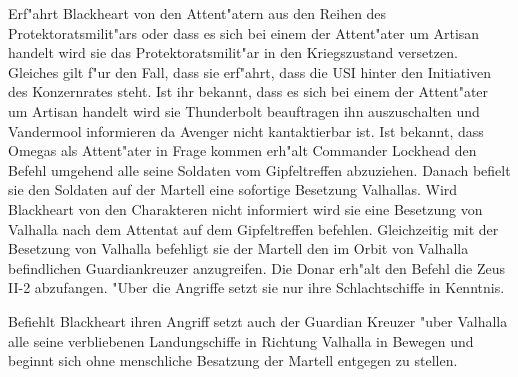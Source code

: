 
























 

Erf"ahrt Blackheart von den Attent"atern aus den Reihen des Protektoratsmilit"ars oder dass es sich bei einem der Attent"ater um Artisan handelt wird sie das Protektoratsmilit"ar in den Kriegszustand versetzen. Gleiches gilt f"ur den Fall, dass sie erf"ahrt, dass die USI hinter den Initiativen des Konzernrates steht. Ist ihr bekannt, dass es sich bei einem der Attent"ater um Artisan handelt wird sie Thunderbolt beauftragen ihn auszuschalten und Vandermool informieren da Avenger nicht kantaktierbar ist. Ist bekannt, dass Omegas als Attent"ater in Frage kommen erh"alt Commander Lockhead den Befehl umgehend alle seine Soldaten vom Gipfeltreffen abzuziehen. Danach befielt sie den Soldaten auf der Martell eine sofortige Besetzung Valhallas. Wird Blackheart von den Charakteren nicht informiert wird sie eine Besetzung von Valhalla nach dem Attentat auf dem Gipfeltreffen befehlen. Gleichzeitig mit der Besetzung von Valhalla befehligt sie der Martell den im Orbit von Valhalla befindlichen Guardiankreuzer anzugreifen. Die Donar erh"alt den Befehl die Zeus II-2 abzufangen. "Uber die Angriffe setzt sie nur ihre Schlachtschiffe in Kenntnis.

Befiehlt Blackheart ihren Angriff setzt auch der Guardian Kreuzer "uber Valhalla alle seine verbliebenen Landungschiffe in Richtung Valhalla in Bewegen und beginnt sich ohne menschliche Besatzung der Martell entgegen zu stellen.

